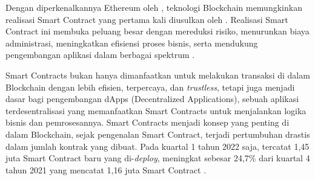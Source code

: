 Dengan diperkenalkannya Ethereum oleh \cite{buterin2013ethereum}, teknologi Blockchain memungkinkan realisasi Smart Contract yang pertama kali diusulkan oleh \cite{szabo1997formalizing}. Realisasi Smart Contract ini membuka peluang besar dengan mereduksi risiko, menurunkan biaya administrasi, meningkatkan efisiensi proses bisnis, serta mendukung pengembangan aplikasi dalam berbagai spektrum \parencite{zheng2020overview}. 

Smart Contracts bukan hanya dimanfaatkan untuk melakukan transaksi di dalam Blockchain dengan lebih efisien, terpercaya, dan \textit{trustless}, tetapi juga menjadi dasar bagi pengembangan dApps (Decentralized Applications), sebuah aplikasi terdesentralisasi yang memanfaatkan Smart Contracts untuk menjalankan logika bisnis dan pemrosesannya. Smart Contracts menjadi konsep yang penting di dalam Blockchain, sejak pengenalan Smart Contract, terjadi pertumbuhan drastis dalam jumlah kontrak yang dibuat. Pada kuartal 1 tahun 2022 saja, tercatat 1,45 juta Smart Contract baru yang di-\textit{deploy}, meningkat sebesar 24,7\% dari kuartal 4 tahun 2021 yang mencatat 1,16 juta Smart Contract \parencite{alchemy_ethereum_statistics}. 

